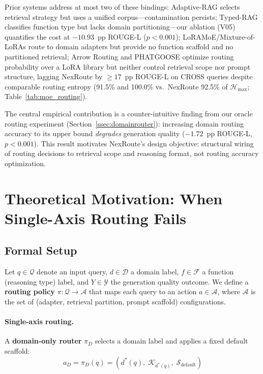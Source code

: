 \documentclass[a4paper,fleql,doubleblind]{cas-sc}
\begin{document}
Prior systems address at most two of these bindings:
Adaptive-RAG selects retrieval strategy but uses a unified corpus---contamination persists;
Typed-RAG classifies function type but lacks domain partitioning---our ablation (V05) quantifies the cost at $-10.93$~pp ROUGE-L ($p{<}0.001$);
LoRAMoE/Mixture-of-LoRAs route to domain adapters but provide no function scaffold and no partitioned retrieval;
Arrow Routing and PHATGOOSE optimize routing probability over a LoRA library but neither control retrieval scope nor prompt structure, lagging NexRoute by ${\geq}17$~pp ROUGE-L on CROSS queries despite comparable routing entropy
(91.5\% and 100.0\% vs.\ NexRoute 92.5\% of $\mathcal{H}_{\max}$; Table~\ref{tab:moe_routing}).

The central empirical contribution is a counter-intuitive finding from our oracle routing experiment (Section~\ref{ssec:domainrouter}): increasing domain routing accuracy to its upper bound \emph{degrades} generation quality ($-1.72$~pp ROUGE-L, $p{<}0.001$). This result motivates NexRoute's design objective: structural wiring of routing decisions to retrieval scope and reasoning format, not routing accuracy optimization.
\section{Theoretical Motivation: When Single-Axis Routing Fails}
\label{sec:theory}

\subsection{Formal Setup}
\label{ssec:theory_setup}

Let $q \in \mathcal{Q}$ denote an input query, $d \in \mathcal{D}$ a domain label,
$f \in \mathcal{F}$ a function (reasoning type) label, and
$Y \in \mathcal{Y}$ the generation quality outcome.
We define a \textbf{routing policy} $\pi: \mathcal{Q} \to \mathcal{A}$ that maps each
query to an action $a \in \mathcal{A}$, where $\mathcal{A}$ is the set of
(adapter, retrieval partition, prompt scaffold) configurations.

\paragraph{Single-axis routing.}
A \textbf{domain-only router} $\pi_D$ selects a domain label and applies a
fixed default scaffold:
\begin{equation}
    a_D = \pi_D(q) = (d^*(q),\; \mathcal{K}_{d^*(q)},\; \mathcal{S}_{\text{default}})
    \label{eq:single_axis}
\end{equation}
\end{document}
